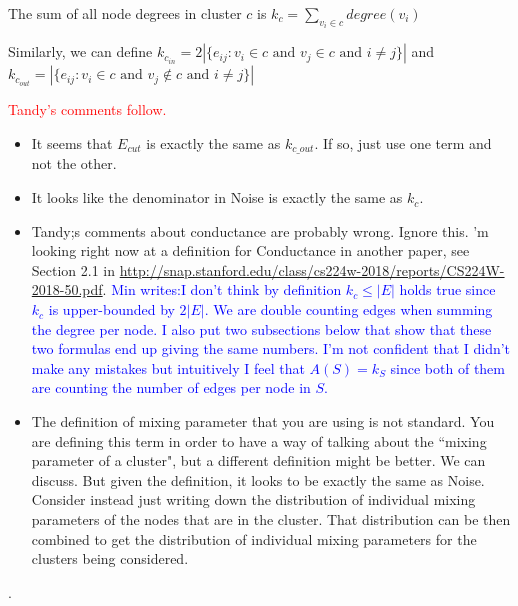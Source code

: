 \documentclass[aps,pre,superscriptaddress]{revtex4}
\begin{document}
The sum of all node degrees in cluster $c$ is $k_{c} = \sum_{v_{i} \in c}{degree(v_{i})}$

Similarly, we can define $k_{c_{in}} = 2|\{e_{ij} : v_{i} \in c \text{ and } v_{j} \in c \text{ and } i \neq j\}|$ and $k_{c_{out}} = |\{e_{ij} : v_{i} \in c \text { and } v_{j} \notin c \text{ and } i \neq j\}|$






\vspace{.1in}
\textcolor{red}{Tandy's comments follow. }

\begin{itemize}

    \item It seems that $E_{cut}$ is exactly the same as $k_{c\_out}$. If so, just use one term and not the other.
    \item It looks like the denominator in Noise is exactly the same as $k_c$.
    \item Tandy;s comments about conductance are probably wrong. Ignore this. 
    'm looking right now at a definition for Conductance in another paper, see Section 2.1 in \url{http://snap.stanford.edu/class/cs224w-2018/reports/CS224W-2018-50.pdf}.    \textcolor{blue}{Min writes:I don't think by definition $k_{c} \leq |E|$ holds true since $k_{c}$ is upper-bounded by $2|E|$. We are double counting edges when summing the degree per node. I also put two subsections below that show that these two formulas end up giving the same numbers. I'm not confident that I didn't make any mistakes but intuitively I feel that $A(S)=k_{S}$ since both of them are counting the number of edges per node in $S$.}
    \item The definition of mixing parameter that you are using is not standard.  You are defining this term in order to have a way of talking about the ``mixing parameter of a cluster", but a different definition might be better. We can discuss.
    But given the definition, it looks to be exactly the same as Noise. 
    Consider instead just writing down the distribution of individual mixing parameters of the nodes that are in the cluster. 
    That distribution can be then combined to 
    get the distribution of individual mixing 
    parameters for the clusters being considered.
\end{itemize}.
\end{document}
